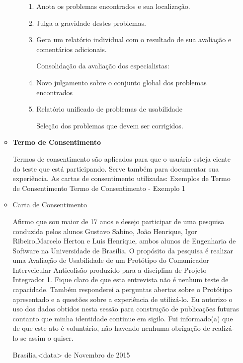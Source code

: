 \begin{enumerate}
\begin{itemize}
\begin{enumerate}
\begin{enumerate}
\item Anota os problemas encontrados e sua localização.

\item Julga a gravidade destes problemas.

\item Gera um relatório individual com o resultado de sua avaliação e comentários adicionais.

Consolidação da avaliação dos especialistas:

\item Novo julgamento sobre o conjunto global dos problemas encontrados
\item Relatório unificado de problemas de usabilidade

Seleção dos problemas que devem ser corrigidos.
\end{enumerate}
\end{enumerate}

\item \textbf{Termo de Consentimento}

Termos de consentimento são aplicados para que o usuário esteja ciente do teste que está participando. Serve também para documentar sua experiência. As cartas de consentimento utilizadas:
Exemplos de Termo de Consentimento
	Termo de Consentimento - Exemplo 1

\item Carta de Consentimento

Afirmo que sou maior de 17 anos e desejo participar de uma pesquisa conduzida pelos alunos Gustavo Sabino, João Henrique, Igor Ribeiro,Marcelo Herton e Luis Henrique, ambos alunos de Engenharia de Software na Universidade de Brasília.
O propósito da pesquisa é realizar uma Avaliação de Usabilidade de um Protótipo do Comunicador Interveicular Anticolisão  produzido para a disciplina de Projeto Integrador 1. Fique claro de que esta entrevista não é nenhum teste de capacidade.
Também responderei a perguntas abertas sobre o Protótipo apresentado e a questões sobre a experiência de utilizá-lo.
Eu autorizo o uso dos dados obtidos nesta sessão para construção de publicações futuras contanto que minha identidade continue em sigilo. Fui informado(a) que de que este ato é voluntário, não havendo nenhuma obrigação de realizá-lo se assim o quiser.

Brasília,<data> de Novembro de 2015

\end{itemize}

\end{enumerate}
